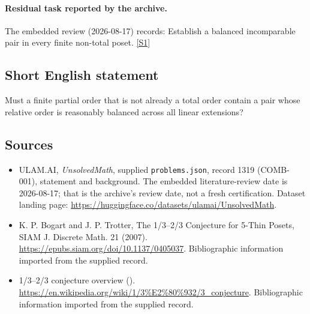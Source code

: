 \documentclass[11pt,a4paper]{article}
\newcommand{\sref}[2]{\hyperlink{source:#1:#2}{[S#2]}}
\begin{document}
\paragraph{Residual task reported by the archive.}

The embedded review (2026-08-17) records: Establish a balanced incomparable pair in every finite non-total poset. \sref{1319}{1}

\subsection{Short English statement}

Must a finite partial order that is not already a total order contain a pair whose relative order is reasonably balanced across all linear extensions?

\subsection{Sources}

{\small

\begin{itemize}

\item[\hypertarget{source:1319:1}{S1}] ULAM.AI, \emph{UnsolvedMath}, supplied \texttt{problems.json}, record 1319 (COMB-001), statement and background. The embedded literature-review date is 2026-08-17; that is the archive’s review date, not a fresh certification. Dataset landing page: \url{https://huggingface.co/datasets/ulamai/UnsolvedMath}.

\item[\hypertarget{source:1319:2}{S2}] K. P. Bogart and J. P. Trotter, The 1/3--2/3 Conjecture for 5-Thin Posets, SIAM J. Discrete Math. 21 (2007). \url{https://epubs.siam.org/doi/10.1137/0405037}. Bibliographic information imported from the supplied record.

\item[\hypertarget{source:1319:3}{S3}] 1/3--2/3 conjecture overview (). \url{https://en.wikipedia.org/wiki/1/3%E2%80%932/3_conjecture}. Bibliographic information imported from the supplied record.

\end{itemize}

}

\label{end:1319}
\end{document}
